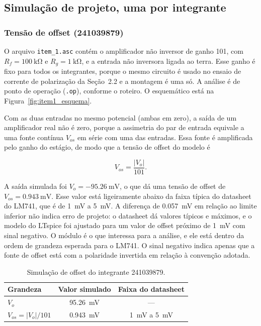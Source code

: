 \documentclass[11pt,a4paper]{article}
\begin{document}
\subsection{Simulação de projeto, uma por integrante}

\subsubsection{Tensão de offset (241039879)}

O arquivo \texttt{item\_1.asc} contém o amplificador não inversor de ganho 101, com $R_f = \SI{100}{\kilo\ohm}$ e $R_g = \SI{1}{\kilo\ohm}$, e a entrada não inversora ligada ao terra. Esse ganho é fixo para todos os integrantes, porque o mesmo circuito é usado no ensaio de corrente de polarização da Seção~2.2 e a montagem é uma só. A análise é de ponto de operação (\texttt{.op}), conforme o roteiro. O esquemático está na Figura~\ref{fig:item1_esquema}.

Com as duas entradas no mesmo potencial (ambas em zero), a saída de um amplificador real não é zero, porque a assimetria do par de entrada equivale a uma fonte contínua $V_{os}$ em série com uma das entradas. Essa fonte é amplificada pelo ganho do estágio, de modo que a tensão de offset do modelo é

\begin{equation}
V_{os} = \frac{|V_o|}{101} .
\label{eq:offset_membro2}
\end{equation}

A saída simulada foi $V_o = \SI{-95,26}{\milli\volt}$, o que dá uma tensão de offset de $V_{os} = \SI{0,943}{\milli\volt}$. Esse valor está ligeiramente abaixo da faixa típica do datasheet do LM741, que é de \SI{1}{\milli\volt} a \SI{5}{\milli\volt}. A diferença de \SI{0,057}{\milli\volt} em relação ao limite inferior não indica erro de projeto: o datasheet dá valores típicos e máximos, e o modelo do LTspice foi ajustado para um valor de offset próximo de \SI{1}{\milli\volt} com sinal negativo. O módulo é o que interessa para a análise, e ele está dentro da ordem de grandeza esperada para o LM741. O sinal negativo indica apenas que a fonte de offset está com a polaridade invertida em relação à convenção adotada.

\begin{table}[h]
\centering
\caption{Simulação de offset do integrante 241039879.}
\label{tab:offset_membro2}
\begin{tabular}{lcc}
\hline
Grandeza & Valor simulado & Faixa do datasheet \\
\hline
$V_o$ & \SI{95,26}{\milli\volt} & --- \\
$V_{os} = |V_o|/101$ & \SI{0,943}{\milli\volt} & \SI{1}{\milli\volt} a \SI{5}{\milli\volt} \\
\hline
\end{tabular}
\end{table}
\end{document}
